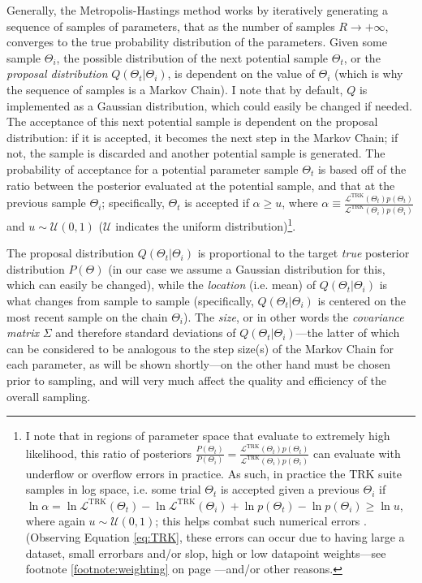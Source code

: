 Generally, the Metropolis-Hastings method works by iteratively generating a sequence of samples of parameters, that as the number of samples $R\rightarrow+\infty$, converges to the true probability distribution of the parameters. Given some sample $\Theta_i$, the possible distribution of the next potential sample $\Theta_t$, or the \textit{proposal distribution} $Q(\Theta_t|\Theta_i)$, is dependent on the value of $\Theta_i$ (which is why the sequence of samples is a Markov Chain). I note that by default, $Q$ is implemented as a Gaussian distribution, which could easily be changed if needed. The acceptance of this next potential sample is dependent on the proposal distribution: if it is accepted, it becomes the next step in the Markov Chain; if not, the sample is discarded and another potential sample is generated. The probability of acceptance for a potential parameter sample $\Theta_t$ is based off of the ratio between the posterior evaluated at the potential sample, and that at the previous sample $\Theta_i$; specifically, $\Theta_t$ is accepted if $\alpha \geq u$, where $\displaystyle\alpha\equiv \frac{\mathcal{L}^\text{TRK}(\Theta_t)p(\Theta_t)}{\mathcal{L}^\text{TRK}(\Theta_i)p(\Theta_i)}$ and $u\sim\mathcal{U}(0,1)$ ($\mathcal{U}$ indicates the uniform distribution)\footnote{\label{footnote:logpost}I note that in regions of parameter space that evaluate to extremely high likelihood, this ratio of posteriors $\displaystyle\frac{P(\Theta_t)}{P(\Theta_i)} = \frac{\mathcal{L}^\text{TRK}(\Theta_t)p(\Theta_t)}{\mathcal{L}^\text{TRK}(\Theta_i)p(\Theta_i)}$ can evaluate with underflow or overflow errors in practice. As such, in practice the TRK suite samples in log space, i.e. some trial $\Theta_t$ is accepted given a previous $\Theta_i$ if $\ln\alpha=\ln\mathcal{L}^\text{TRK}(\Theta_t) - \ln\mathcal{L}^\text{TRK}(\Theta_i) + \ln p(\Theta_t) - \ln p(\Theta_i)\geq \ln u$, where again $u\sim\mathcal{U}(0,1)$; this helps combat such numerical errors \textcite{stackoverflowlogpostsoln}. (Observing Equation \eqref{eq:TRK}, these errors can occur due to having large a dataset, small errorbars and/or slop, high or low datapoint weights---see footnote \ref{footnote:weighting} on page \pageref{footnote:weighting}---and/or other reasons.}.

The proposal distribution $Q(\Theta_t|\Theta_i)$ is proportional to the target \textit{true} posterior distribution $P(\Theta)$ (in our case we assume a Gaussian distribution for this, which can easily be changed), while the \textit{location} (i.e. mean) of $Q(\Theta_t|\Theta_i)$ is what changes from sample to sample (specifically, $Q(\Theta_t|\Theta_i)$ is centered on the most recent sample on the chain $\Theta_i$). The \textit{size}, or in other words the \textit{covariance matrix} $\Sigma$ and therefore standard deviations of $Q(\Theta_t|\Theta_i)$---the latter of which can be considered to be analogous to the step size(s) of the Markov Chain for each parameter, as will be shown shortly---on the other hand must be chosen prior to sampling, and will very much affect the quality and efficiency of the overall sampling. 

